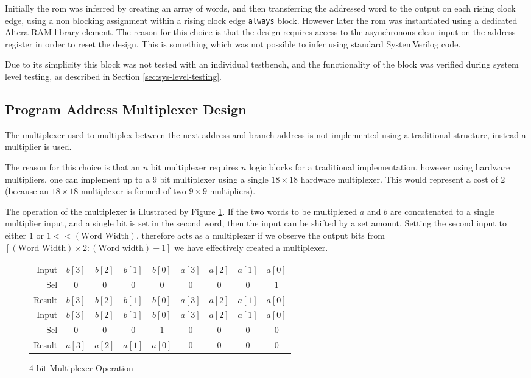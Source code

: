 Initially the \gls{rom} was inferred by creating an array of words, and then transferring the addressed word to the output on each rising clock edge, using a non blocking assignment within a rising clock edge \texttt{always} block. However later the \gls{rom} was instantiated using a dedicated Altera RAM library element. The reason for this choice is that the design requires access to the asynchronous clear input on the address register in order to reset the design. This is something which was not possible to infer using standard SystemVerilog code.

Due to its simplicity this block was not tested with an individual testbench, and the functionality of the block was verified during system level testing, as described in Section \ref{sec:sys-level-testing}.

\subsection{Program Address Multiplexer Design}
The multiplexer used to multiplex between the next address and branch address is not implemented using a traditional structure, instead a multiplier is used.

The reason for this choice is that an $n$ bit multiplexer requires $n$ logic blocks for a traditional implementation, however using hardware multipliers, one can implement up to a $9$ bit multiplexer using a single $18 \times 18$ hardware multiplexer. This would represent a cost of $2$ (because an $18 \times 18$ multiplexer is formed of two $9\times9$ multipliers).

The operation of the multiplexer is illustrated by Figure \ref{fig:mux-operation}. If the two words to be multiplexed $a$ and $b$ are concatenated to a single multiplier input, and a single bit is set in the second word, then the input can be shifted by a set amount. Setting the second input to either $1$ or $1 << (\text{Word Width})$, therefore acts as a multiplexer if we observe the output bits from $[(\text{Word Width}) \times 2: (\text{Word width}) + 1]$ we have effectively created a multiplexer.

\begin{figure}[ht]
	\centering
	\begin{tabular}{r *{8}{|c}}
		Input & $b[3]$ & $b[2]$ & $b[1]$ & $b[0]$ & $a[3]$ & $a[2]$ & $a[1]$ & $a[0]$ \\
		Sel & $0$ & $0$ & $0$ & $0$ & $0$ & $0$ & $0$ & $1$  \\
		Result & \shadeCell $b[3]$ & \shadeCell $b[2]$ & \shadeCell $b[1]$ & \shadeCell $b[0]$ & $a[3]$ & $a[2]$ & $a[1]$ & $a[0]$ \\
		\midrule
		Input & $b[3]$ & $b[2]$ & $b[1]$ & $b[0]$ & $a[3]$ & $a[2]$ & $a[1]$ & $a[0]$ \\
		Sel & $0$ & $0$ & $0$ & $1$ & $0$ & $0$ & $0$ & $0$  \\
		Result & \shadeCell $a[3]$ & \shadeCell $a[2]$ & \shadeCell $a[1]$ & \shadeCell $a[0]$ & $0$ & $0$  & $0$  & $0$  \\
	\end{tabular}
	\caption{4-bit Multiplexer Operation}
	\label{fig:mux-operation}
\end{figure}

